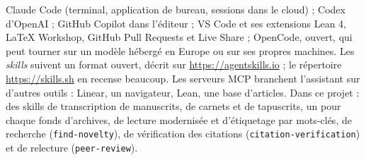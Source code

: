 \begin{outils}
Claude Code (terminal, application de bureau, sessions dans le cloud) ; Codex
d'OpenAI ; GitHub Copilot dans l'éditeur ; VS Code et ses extensions Lean 4, LaTeX Workshop, GitHub Pull Requests et Live Share ; OpenCode, ouvert, qui peut tourner sur un modèle
hébergé en Europe ou sur ses propres machines. Les \emph{skills} suivent un format ouvert,
décrit sur \url{https://agentskills.io} ; le répertoire \url{https://skills.sh} en recense
beaucoup. Les serveurs MCP branchent l'assistant sur d'autres outils : Linear, un navigateur,
Lean, une base d'articles. Dans ce projet : des skills de transcription
de manuscrits, de carnets et de tapuscrits, un pour chaque fonds d'archives, de lecture
modernisée et d'étiquetage par mots-clés, de recherche
(\texttt{find-novelty}), de vérification des citations (\texttt{citation-verification}) et de
relecture (\texttt{peer-review}).
\end{outils}
